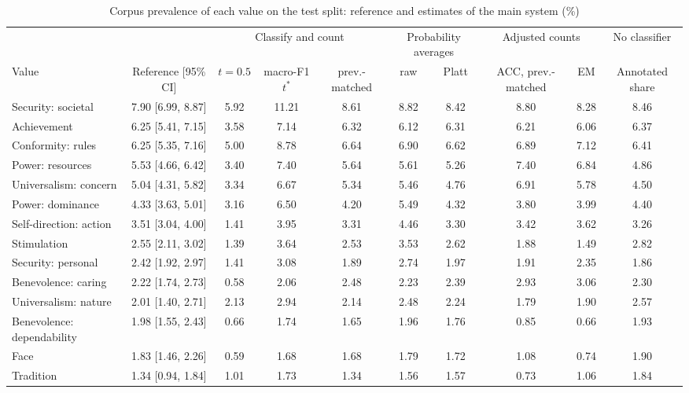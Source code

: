 \begin{table}[t]
\caption{Corpus prevalence of each value on the test split: reference and estimates of the main system (\%)}
\label{tab:prevalence}
\centering
\scriptsize
\setlength{\tabcolsep}{3pt}
\begin{tabular*}{\textwidth}{@{\extracolsep{\fill}}lccccccccc@{}}
\toprule
 & & \multicolumn{3}{c}{Classify and count} & \multicolumn{2}{c}{Probability averages} & \multicolumn{2}{c}{Adjusted counts} & No classifier \\
\cmidrule(lr){3-5}\cmidrule(lr){6-7}\cmidrule(lr){8-9}\cmidrule(l){10-10}
Value & Reference [95\% CI] & $t = 0.5$ & macro-F1 $t^*$ & prev.-matched & raw & Platt & ACC, prev.-matched & EM & Annotated share \\
\midrule
Security: societal & 7.90 [6.99, 8.87] & 5.92 & 11.21 & 8.61 & 8.82 & 8.42 & 8.80 & 8.28 & 8.46 \\
Achievement & 6.25 [5.41, 7.15] & 3.58 & 7.14 & 6.32 & 6.12 & 6.31 & 6.21 & 6.06 & 6.37 \\
Conformity: rules & 6.25 [5.35, 7.16] & 5.00 & 8.78 & 6.64 & 6.90 & 6.62 & 6.89 & 7.12 & 6.41 \\
Power: resources & 5.53 [4.66, 6.42] & 3.40 & 7.40 & 5.64 & 5.61 & 5.26 & 7.40 & 6.84 & 4.86 \\
Universalism: concern & 5.04 [4.31, 5.82] & 3.34 & 6.67 & 5.34 & 5.46 & 4.76 & 6.91 & 5.78 & 4.50 \\
Power: dominance & 4.33 [3.63, 5.01] & 3.16 & 6.50 & 4.20 & 5.49 & 4.32 & 3.80 & 3.99 & 4.40 \\
Self-direction: action & 3.51 [3.04, 4.00] & 1.41 & 3.95 & 3.31 & 4.46 & 3.30 & 3.42 & 3.62 & 3.26 \\
Stimulation & 2.55 [2.11, 3.02] & 1.39 & 3.64 & 2.53 & 3.53 & 2.62 & 1.88 & 1.49 & 2.82 \\
Security: personal & 2.42 [1.92, 2.97] & 1.41 & 3.08 & 1.89 & 2.74 & 1.97 & 1.91 & 2.35 & 1.86 \\
Benevolence: caring & 2.22 [1.74, 2.73] & 0.58 & 2.06 & 2.48 & 2.23 & 2.39 & 2.93 & 3.06 & 2.30 \\
Universalism: nature & 2.01 [1.40, 2.71] & 2.13 & 2.94 & 2.14 & 2.48 & 2.24 & 1.79 & 1.90 & 2.57 \\
Benevolence: dependability & 1.98 [1.55, 2.43] & 0.66 & 1.74 & 1.65 & 1.96 & 1.76 & 0.85 & 0.66 & 1.93 \\
Face & 1.83 [1.46, 2.26] & 0.59 & 1.68 & 1.68 & 1.79 & 1.72 & 1.08 & 0.74 & 1.90 \\
Tradition & 1.34 [0.94, 1.84] & 1.01 & 1.73 & 1.34 & 1.56 & 1.57 & 0.73 & 1.06 & 1.84 \\

\end{tabular*}
\end{table}
